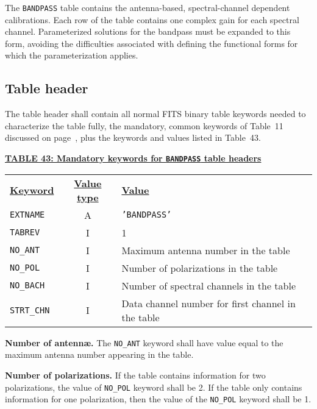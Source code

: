 \documentclass[twoside]{article}
\newcommand{\Me}[1]{\textcolor{mecol}{#1}}
\begin{document}
The {\tt BANDPASS} table contains the antenna-based, spectral-channel
dependent calibrations.  \Me{Each row of the table contains one
  complex gain for each spectral channel.  Parameterized solutions for
  the bandpass must be expanded to this form, avoiding the
  difficulties associated with defining the functional forms for which
  the parameterization applies.}

\subsection{Table header}

The table header shall contain all normal FITS binary table keywords
needed to characterize the table fully, the mandatory, common keywords
of Table~11 discussed on page~\pageref{ta:keywords}, plus the keywords
and values listed in Table~43.

\begin{center}
\underline{\bf{TABLE 43: Mandatory keywords for {\tt BANDPASS} table
    headers}}\\
\begin{tabular}{lcl}
\noalign{\vspace{2pt}}
\underline{{\bf Keyword}} & \underline{\bf{Value type}} &
    \underline{\bf{Value\vphantom{y}}} \\
\noalign{\vspace{2pt}}
{\tt EXTNAME}   & A & {\tt 'BANDPASS'}  \\
{\tt TABREV}    & I & 1 \\
{\tt NO\_ANT}   & I & Maximum antenna number in the table \\
{\tt NO\_POL}   & I & Number of polarizations in the table \\
{\tt NO\_BACH}  & I & Number of spectral channels in the table \\
{\tt STRT\_CHN} & I & Data channel number for first channel in the table \\
\end{tabular}
\end{center}

{\bf Number of antenn\ae.}  The {\tt NO\_ANT} keyword shall have value
equal to the maximum antenna number appearing in the table.

{\bf Number of polarizations.}  If the table contains information for
two polarizations, the value of {\tt NO\_POL} keyword shall be 2.  If
the table only contains information for one polarization, then the
value of the {\tt NO\_POL} keyword shall be 1.
\end{document}
